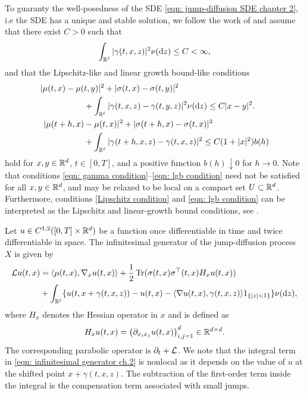 To guaranty the well-posedness of the SDE \eqref{eqn: jump-diffusion SDE chapter 2}, i.e the SDE has a unique and stable solution, we follow the work of \textcite{seydel2010generalexistenceuniquenessviscosity} and assume that there exist $C>0$ such that
\begin{equation}
    \int_{\mathbb{R}^\ell}|\gamma(t,x,z)|^2 \nu(\mathrm{d} z) \leq C < \infty,
    \label{eqn: gamma condition}
\end{equation}
and that the Lipschitz-like and linear growth bound-like conditions 
\begin{align}
    |\mu(t,x) - \mu(&t,y)|^2 + |\sigma(t,x) - \sigma(t,y)|^2 \nonumber\\
    & + \int_{\mathbb{R}^\ell} |\gamma(t,x,z) - \gamma(t,y,z)|^2 \nu(\mathrm{d} z) \leq C |x-y|^2.
    \label{eqn: Lipschitz condition} \\
    |\mu(t+h,x) &- \mu(t,x)|^2 + |\sigma(t+h,x) - \sigma(t,x)|^2 \nonumber\\
    &+ \int_{\mathbb{R}^\ell}|\gamma(t+h,x,z) - \gamma(t,x,z)|^2 \leq C (1+|x|^2) b(h)
    \label{eqn: lgb condition}
\end{align}
hold for $x,y \in \mathbb{R}^d$, $t \in [0,T]$, and a positive function $b(h) \downarrow 0$ for $h \rightarrow 0$. Note that conditions \eqref{eqn: gamma condition}--\eqref{eqn: lgb condition} need not be satisfied for all $x,y \in \mathbb{R}^d$, and may be relaxed to be local on a compact set $U \subset \mathbb{R}^d$. Furthermore, conditions \eqref{Lipschitz condition} and \eqref{eqn: lgb condition} can be interpreted as the Lipschitz and linear-growth bound conditions, see \cite{pham1998optimal}. 

Let $u \in C^{1,2}([0,T] \times \mathbb{R}^d)$ be a function once differentiable in time and twice differentiable in space. The infinitesimal generator of the jump-diffusion process $X$ is given by
\begin{align}
    \mathcal{L} u(t,x) &= \langle \mu(t,x), \nabla_x u(t,x) \rangle + \frac{1}{2} \operatorname{Tr} (\sigma(t,x)\sigma^\top(t,x)H_x u(t,x)) \nonumber\\
    &+ \int_{\mathbb{R}^\ell} \{u(t,x+\gamma(t,x,z)) - u(t,x) - \langle \nabla u(t,x), \gamma(t,x,z) \rangle 1_{\left\{|z|<1\right\}}\} \nu(\mathrm{d} z),
    \label{eqn: infinitesimal generator ch.2}
\end{align}
where $H_x$ denotes the Hessian operator in $x$ and is defined as
\begin{equation*}
    H_x u(t,x) = \big(\partial_{x_i x_j}u(t,x)\big)_{i,j=1}^d \in \mathbb{R}^{d \times d}.
\end{equation*}
The corresponding parabolic operator is $\partial_t + \mathcal{L}$. We note that the integral term in \eqref{eqn: infinitesimal generator ch.2} is nonlocal as it depends on the value of $u$ at the shifted point $x+\gamma(t,x,z)$. The subtraction of the first-order term inside the integral is the compensation term associated with small jumps.

